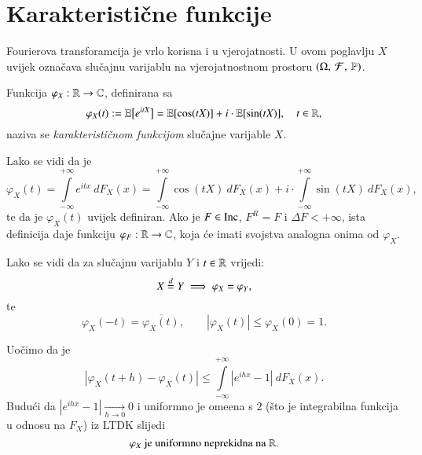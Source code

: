 
\chapter{Karakteristi\v cne funkcije}

Fourierova transforamcija je vrlo korisna i u vjerojatnosti.
U ovom poglavlju $X$ uvijek ozna\v cava slu\v cajnu varijablu na vjerojatnostnom prostoru $(\Omega, \: \mathcal{F}, \: \mathbb{P})$.

\begin{defn}    \label{def:17.1}
    Funkcija $\varphi_X :  \mathbb{R} \to \mathbb{C}$, definirana sa
    \begin{equation*}
        \varphi_X (t) := \mathbb{E} \big[ e^{itX} \big] = \mathbb{E}[\cos (tX)] + i \cdot \mathbb{E} [ \sin (tX) ], \quad t \in \mathbb{R},
    \end{equation*}
    naziva se \emph{karakteristi\v cnom funkcijom} slu\v cajne varijable $X$.
\end{defn}

Lako se vidi da je
\begin{equation*}
    \varphi_X (t) = \int\limits_{-\infty}^{+\infty} e^{i t x} \: d F_X (x) = \int\limits_{-\infty}^{+ \infty} \cos (t X)  \: d F_X (x) + i \cdot \int\limits_{-\infty}^{+\infty} \sin (t X) \: d F_X (x),
\end{equation*}
te da je $\varphi_X (t)$ uvijek definiran.
Ako je $F \in \mathrm{Inc}$, $F^R = F$ i $\Delta F < +\infty$, ista definicija daje funkciju $\varphi_F : \mathbb{R} \to \mathbb{C}$, koja \' ce imati svojstva analogna onima od $\varphi_X$.

Lako se vidi da za slu\v cajnu varijablu $Y$ i $t \in \mathbb{R}$ vrijedi:
\begin{equation}    \label{jed:17.2}
    X \overset{d}{=} Y \implies \varphi_X = \varphi_Y,
\end{equation}
te
\begin{equation}    \label{jed:17.3}
    \varphi_X(-t) = \overline{\varphi_X (t)}, \quad \quad |\varphi_X (t)| \leq \varphi_X(0) = 1.
\end{equation}

Uo\v cimo da je
\begin{equation*}
    |\varphi_X (t+h) - \varphi_X(t)| \leq \int\limits_{-\infty}^{+\infty} |e^{i h x} - 1| \: d F_X (x).    
\end{equation*}
Budu\' ci da $|e^{i h x} -1| \xrightarrow[h \to 0]{} 0$ i uniformno je ome\dj ena s $2$ (\v sto je integrabilna funkcija u odnosu na $F_X$) iz LTDK slijedi
\begin{equation}    \label{jed:17.4}
    \varphi_X \textnormal{ je uniformno neprekidna na } \mathbb{R}.
\end{equation}

